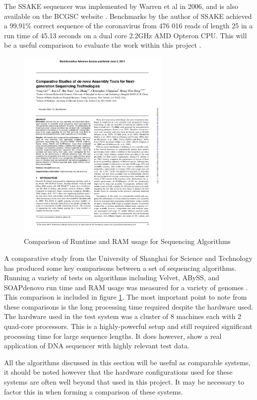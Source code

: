 The SSAKE sequencer was implemented by Warren et al in 2006, and is also available on the BCGSC website \cite{SSAKEDOWNLOAD}. Benchmarks by the author of SSAKE achieved a 99.91\% correct sequence of the coronavirus from 476 016 reads of length 25 in a run time of 45.13 seconds on a dual core 2.2GHz AMD Opteron CPU. This will be a useful comparison to evaluate the work within this project \cite{warren2007assembling}.
\begin{figure}[h!]
\centering
  \includegraphics[width=0.65\textwidth,page=6]{./figs/comparisonlib.pdf}
  \caption{Comparison of Runtime and RAM usage for Sequencing Algorithms \cite{lin2011comparative}}
  \label{fig:comp}
\end{figure}
\pagebreak

A comparative study from the University of Shanghai for Science and Technology has produced some key comparisons between a set of sequencing algorithms. Running a variety of tests on algorithms including Velvet, ABySS, and SOAPdenovo run time and RAM usage was measured for a variety of genomes \cite{lin2011comparative}. This comparison is included in figure \ref{fig:comp}. The most important point to note from these comparisons is the long processing time required despite the hardware used. The hardware used in the test system was a cluster of 8 machines each with 2 quad-core processors. This is a highly-powerful setup and still required significant processing time for large sequence lengths. It does however, show a real application of DNA sequencer with highly relevant test data.


All the algorithms discussed in this section will be useful as comparable systems, it should be noted however that the hardware configurations used for these systems are often well beyond that used in this project. It may be necessary to factor this in when forming a comparison of these systems.







